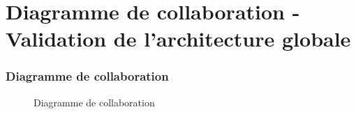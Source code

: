 \part{Diagramme de collaboration - Validation de l'architecture globale}
\setcounter{section}{0}

\section{Diagramme de collaboration}
\begin{figure}[H]
\noindent{}
\caption{Diagramme de collaboration}
\end{figure}

